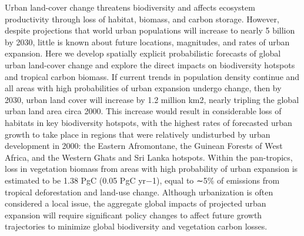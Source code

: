 Urban land-cover change threatens biodiversity and affects ecosystem productivity through loss of habitat, biomass, and carbon storage. However, despite projections that world urban populations will increase to nearly 5 billion by 2030, little is known about future locations, magnitudes, and rates of urban expansion. Here we develop spatially explicit probabilistic forecasts of global urban land-cover change and explore the direct impacts on biodiversity hotspots and tropical carbon biomass. If current trends in population density continue and all areas with high probabilities of urban expansion undergo change, then by 2030, urban land cover will increase by 1.2 million km2, nearly tripling the global urban land area circa 2000. This increase would result in considerable loss of habitats in key biodiversity hotspots, with the highest rates of forecasted urban growth to take place in regions that were relatively undisturbed by urban development in 2000: the Eastern Afromontane, the Guinean Forests of West Africa, and the Western Ghats and Sri Lanka hotspots. Within the pan-tropics, loss in vegetation biomass from areas with high probability of urban expansion is estimated to be 1.38 PgC (0.05 PgC yr−1), equal to ∼5\% of emissions from tropical deforestation and land-use change. Although urbanization is often considered a local issue, the aggregate global impacts of projected urban expansion will require significant policy changes to affect future growth trajectories to minimize global biodiversity and vegetation carbon losses.
